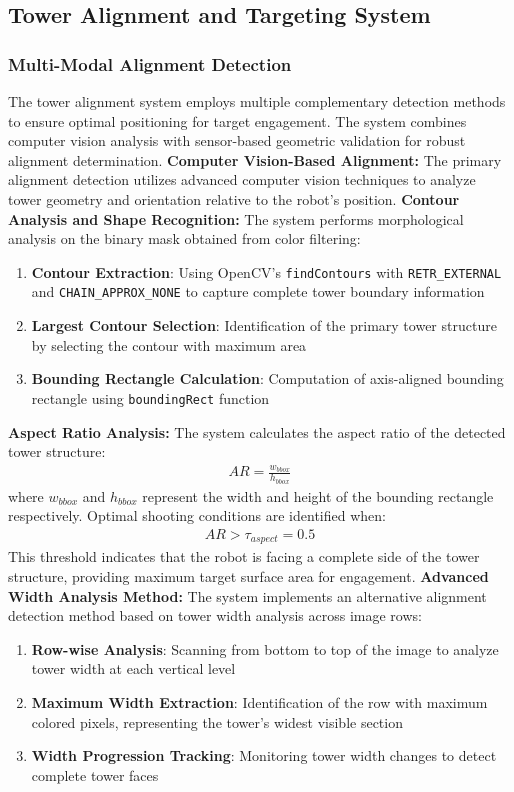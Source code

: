 \subsection{Tower Alignment and Targeting System}
\subsubsection{Multi-Modal Alignment Detection}
The tower alignment system employs multiple complementary detection methods to ensure optimal positioning for target engagement. The system combines computer vision analysis with sensor-based geometric validation for robust alignment determination.
\textbf{Computer Vision-Based Alignment:}
The primary alignment detection utilizes advanced computer vision techniques to analyze tower geometry and orientation relative to the robot's position.
\textbf{Contour Analysis and Shape Recognition:}
The system performs morphological analysis on the binary mask obtained from color filtering:
\begin{enumerate}
\item \textbf{Contour Extraction}: Using OpenCV's \texttt{findContours} with \texttt{RETR\_EXTERNAL} and \texttt{CHAIN\_APPROX\_NONE} to capture complete tower boundary information
\item \textbf{Largest Contour Selection}: Identification of the primary tower structure by selecting the contour with maximum area
\item \textbf{Bounding Rectangle Calculation}: Computation of axis-aligned bounding rectangle using \texttt{boundingRect} function
\end{enumerate}
\textbf{Aspect Ratio Analysis:}
The system calculates the aspect ratio of the detected tower structure:
\begin{align}
AR = \frac{w_{bbox}}{h_{bbox}}
\end{align}
where $w_{bbox}$ and $h_{bbox}$ represent the width and height of the bounding rectangle respectively.
Optimal shooting conditions are identified when:
\begin{align}
AR > \tau_{aspect} = 0.5
\end{align}
This threshold indicates that the robot is facing a complete side of the tower structure, providing maximum target surface area for engagement.
\textbf{Advanced Width Analysis Method:}
The system implements an alternative alignment detection method based on tower width analysis across image rows:
\begin{enumerate}
\item \textbf{Row-wise Analysis}: Scanning from bottom to top of the image to analyze tower width at each vertical level
\item \textbf{Maximum Width Extraction}: Identification of the row with maximum colored pixels, representing the tower's widest visible section
\item \textbf{Width Progression Tracking}: Monitoring tower width changes to detect complete tower faces
\end{enumerate}
